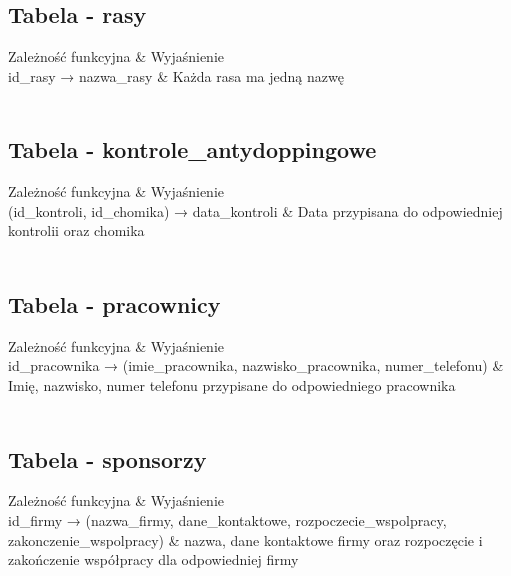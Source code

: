 \documentclass{article}
\begin{document}
\subsection{Tabela - rasy}

\begin{tcolorbox}[tab2,tabularx={X||X}]
Zależność funkcyjna & Wyjaśnienie     \\
\hline
\hline
id\_rasy → nazwa\_rasy & Każda rasa ma jedną nazwę \\  \\    
\end{tcolorbox}

\subsection{Tabela - kontrole\_antydoppingowe}

\begin{tcolorbox}[tab2,tabularx={X||X}]
Zależność funkcyjna & Wyjaśnienie     \\
\hline
\hline
(id\_kontroli, id\_chomika) → data\_kontroli & Data przypisana do odpowiedniej kontrolii oraz chomika \\  \\    
\end{tcolorbox}

\subsection{Tabela - pracownicy}

\begin{tcolorbox}[tab2,tabularx={X||X}]
Zależność funkcyjna & Wyjaśnienie     \\
\hline
\hline
id\_pracownika → (imie\_pracownika, nazwisko\_pracownika, numer\_telefonu) & Imię, nazwisko, numer telefonu przypisane do odpowiedniego pracownika \\  \\    
\end{tcolorbox}

\subsection{Tabela - sponsorzy}

\begin{tcolorbox}[tab2,tabularx={X||X}]
Zależność funkcyjna & Wyjaśnienie     \\
\hline
\hline
id\_firmy → (nazwa\_firmy, dane\_kontaktowe, rozpoczecie\_wspolpracy, zakonczenie\_wspolpracy) & nazwa, dane kontaktowe firmy oraz rozpoczęcie i zakończenie współpracy dla odpowiedniej firmy\\  \\    
\end{tcolorbox}
\end{document}
